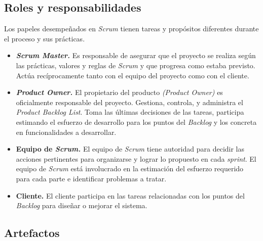 \subsection{Roles y responsabilidades}
Los papeles desempeñados en \textit{Scrum} tienen tareas y propósitos diferentes durante el proceso y sus prácticas.

\begin{itemize}
\item \textbf{\textit{Scrum Master.}} Es responsable de asegurar que el proyecto se realiza según las prácticas, valores y reglas de \textit{Scrum} y que progresa como estaba previsto. Actúa recíprocamente tanto con el equipo del proyecto como con el cliente. %

\item \textbf{\textit{Product Owner.}} El propietario del producto \textit{(Product Owner)} es oficialmente responsable del proyecto.  Gestiona, controla, y administra el \textit{Product Backlog List}. Toma las últimas decisiones de las tareas, participa estimando el esfuerzo de desarrollo para los puntos del \textit{Backlog} y los concreta en funcionalidades a desarrollar.

\item \textbf{Equipo de \textit{Scrum.}} El equipo de \textit{Scrum} tiene autoridad para decidir las acciones pertinentes para organizarse y lograr lo propuesto en cada \textit{sprint}. El equipo de \textit{Scrum} está involucrado en la estimación del esfuerzo requerido para cada parte e identificar problemas a tratar.

\item \textbf{Cliente.} El cliente participa en las tareas relacionadas con los puntos del \textit{Backlog} para diseñar o mejorar el sistema.

\end{itemize}

\subsection{Artefactos}
